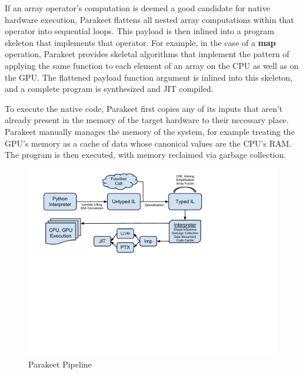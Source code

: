 \documentclass[10pt,twocolumn]{article}
\begin{document}
If an array operator's computation is deemed a good candidate for native hardware execution, Parakeet flattens all nested array computations within that operator into sequential loops.  This payload is then inlined into a program skeleton that implements that operator.  For example, in the case of a \textbf{map} operation, Parakeet provides skeletal algorithms that implement the pattern of applying the same function to each element of an array on the CPU as well as on the GPU.  The flattened payload function argument is inlined into this skeleton, and a complete program is synthesized and JIT compiled.

To execute the native code, Parakeet first copies any of its inputs that aren't already present in the memory of the target hardware to their necessary place.  Parakeet manually manages the memory of the system, for example treating the GPU's memory as a cache of data whose canonical values are the CPU's RAM. The program is then executed, with memory reclaimed via garbage collection.

\begin{figure}[t!bh]
\begin{center}
\leavevmode
\includegraphics[scale=0.6, trim=0pt 310pt 140pt 80pt]{ParakeetNumPyOverview.pdf}
\end{center}
\caption{Parakeet Pipeline}
\label{fig:overview}
\end{figure}
\end{document}
